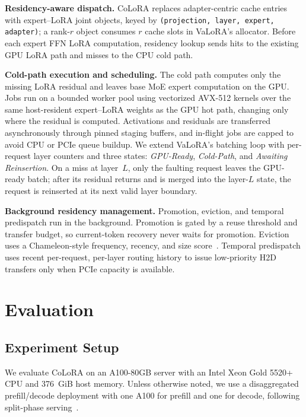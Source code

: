 \documentclass[sigplan,anonymous,review,10pt]{acmart}
\begin{document}
\textbf{Residency-aware dispatch.}
CoLoRA replaces adapter-centric cache entries with expert--LoRA joint objects, keyed by \texttt{(projection, layer, expert, adapter)}; a rank-$r$ object consumes $r$ cache slots in VaLoRA's allocator. Before each expert FFN LoRA computation, residency lookup sends hits to the existing GPU LoRA path and misses to the CPU cold path.

\textbf{Cold-path execution and scheduling.}
The cold path computes only the missing LoRA residual and leaves base MoE expert computation on the GPU. Jobs run on a bounded worker pool using vectorized AVX-512 kernels over the same host-resident expert--LoRA weights as the GPU hot path, changing only where the residual is computed. Activations and residuals are transferred asynchronously through pinned staging buffers, and in-flight jobs are capped to avoid CPU or PCIe queue buildup. We extend VaLoRA's batching loop with per-request layer counters and three states: \textit{GPU-Ready}, \textit{Cold-Path}, and \textit{Awaiting Reinsertion}. On a miss at layer~$L$, only the faulting request leaves the GPU-ready batch; after its residual returns and is merged into the layer-$L$ state, the request is reinserted at its next valid layer boundary.

\textbf{Background residency management.}
Promotion, eviction, and temporal predispatch run in the background. Promotion is gated by a reuse threshold and transfer budget, so current-token recovery never waits for promotion. Eviction uses a Chameleon-style frequency, recency, and size score~\cite{iliakopoulou2025chameleon}. Temporal predispatch uses recent per-request, per-layer routing history to issue low-priority H2D transfers only when PCIe capacity is available.


\section{Evaluation}
\label{sec:evaluation}

\subsection{Experiment Setup}
\label{subsec:setup}

We evaluate CoLoRA on an A100-80GB server with an Intel Xeon Gold 5520+ CPU and 376~GiB host memory. Unless otherwise noted, we use a disaggregated prefill/decode deployment with one A100 for prefill and one for decode, following split-phase serving~\cite{patel2024splitwise}. 
\end{document}
